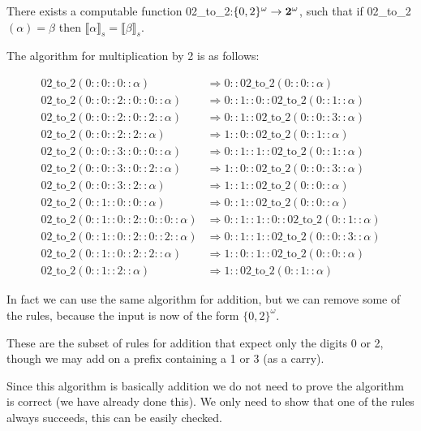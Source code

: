 \documentclass{cs4rep}
\begin{document}
\begin{myprop}
  There exists a computable function 02\_to\_2:$\{0,2\}^{\omega}
  \rightarrow {\bf 2^{\omega}}$, such that if 02\_to\_2$(\alpha) =
  \beta$ then $ \llbracket \alpha \rrbracket_{s} = \llbracket \beta
  \rrbracket_{s}$.
\end{myprop}

The algorithm for multiplication by 2 is as follows:

\[ \begin{array}{ll}
\mbox{02\_to\_2}(0::0::0::\alpha) & \Rightarrow 0::\mbox{02\_to\_2}(0::0::\alpha) \\
\mbox{02\_to\_2}(0::0::2::0::0::\alpha) & \Rightarrow 0::1::0::\mbox{02\_to\_2}(0::1::\alpha) \\
\mbox{02\_to\_2}(0::0::2::0::2::\alpha) & \Rightarrow 0::1::\mbox{02\_to\_2}(0::0::3::\alpha) \\
\mbox{02\_to\_2}(0::0::2::2::\alpha) & \Rightarrow 1::0::\mbox{02\_to\_2}(0::1::\alpha) \\
\mbox{02\_to\_2}(0::0::3::0::0::\alpha) & \Rightarrow 0::1::1::\mbox{02\_to\_2}(0::1::\alpha) \\
\mbox{02\_to\_2}(0::0::3::0::2::\alpha) & \Rightarrow 1::0::\mbox{02\_to\_2}(0::0::3::\alpha) \\
\mbox{02\_to\_2}(0::0::3::2::\alpha) & \Rightarrow 1::1::\mbox{02\_to\_2}(0::0::\alpha) \\
\mbox{02\_to\_2}(0::1::0::0::\alpha) & \Rightarrow 0::1::\mbox{02\_to\_2}(0::0::\alpha) \\
\mbox{02\_to\_2}(0::1::0::2::0::0::\alpha) & \Rightarrow 0::1::1::0::\mbox{02\_to\_2}(0::1::\alpha) \\
\mbox{02\_to\_2}(0::1::0::2::0::2::\alpha) & \Rightarrow 0::1::1::\mbox{02\_to\_2}(0::0::3::\alpha) \\
\mbox{02\_to\_2}(0::1::0::2::2::\alpha) & \Rightarrow 1::0::1::\mbox{02\_to\_2}(0::0::\alpha) \\
\mbox{02\_to\_2}(0::1::2::\alpha) & \Rightarrow 1::\mbox{02\_to\_2}(0::1::\alpha)
\end{array} \]

In fact we can use the same algorithm for addition, but we can remove some of the rules, because the input is now of the form $\{0,2\}^{\omega}$.

These are the subset of rules for addition that expect only the digits 0 or 2, though we may add on a prefix containing a 1 or 3 (as a carry).

Since this algorithm is basically addition we do not need to prove the
algorithm is correct (we have already done this). We only need to
show that one of the rules always succeeds, this can be easily
checked.
\end{document}
